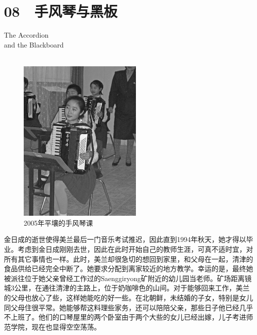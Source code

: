\fancyhead[RO]{{\tiny{\textcolor{Gray}{\FA \ }}}\thepage}
\fancyhead[LE]{{\tiny{\textcolor{Gray}{\FA \ }}}\thepage}
\fancyfoot[LE,RO]{}
\fancyfoot[LO,CE]{}
\fancyfoot[CO,RE]{}
\chapter*{08 {\FA } 手风琴与黑板}
\begin{flushright}
	\textcolor{PinYinColor}{\EN \huge{The Accordion\\
		and the Blackboard\\
	\ \\}}
\end{flushright}
\begin{figure}[!htbp]
	\centering
	\includegraphics[width=6cm]{./Chapters/Images/08.jpg}
	\caption*{2005年平壤的手风琴课}
\end{figure}


金日成的逝世使得美兰最后一门音乐考试推迟，因此直到1994年秋天，她才得以毕业。考虑到金日成刚刚去世，因此在此时开始自己的教师生涯，可真不适时宜，对所有其它事情也一样。此时，美兰却很急切的想回到家里，和父母在一起，清津的食品供给已经完全中断了。她要求分配到离家较近的地方教学。幸运的是，最终她被派往位于她父亲曾经工作过的Saenggiryong矿附近的幼儿园当老师。矿场距离镜城3公里，在通往清津的主路上，位于奶咖啡色的山间。对于能够回来工作，美兰的父母也放心了些，这样她能吃的好一些。在北朝鲜，未结婚的子女，特别是女儿同父母住很平常。她能够帮这料理些家务，还可以陪陪父亲，那些日子他已经几乎不上班了。他们的口琴屋里的两个卧室由于两个大些的女儿已经出嫁，儿子考进师范学院，现在也显得空空荡荡。\\

